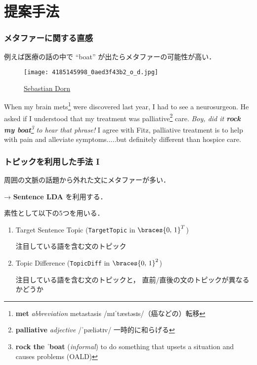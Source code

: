 \documentclass[11pt,usepdftitle=false]{beamer}
\let\phonetic\relax
\newcommand\metaphorical[1]{\textcolor{sRed}{\textbf{#1}}}
\newcommand\abbr[1]{\textcolor{sForestGreen}{#1}}
\newcommand\headword[1]{\textcolor{sDarkBlue}{\textbf{#1}}}
\newcommand\misc[1]{\textcolor{sLightGray2}{(\textit{#1})}}
\let\oldcitep=\citep
\renewcommand\citep[1]{\hyperlink{#1}{\oldcitep{#1}}}
\begin{document}
\section{提案手法}
\begin{frame}
\frametitle{メタファーに関する直感}
例えば医療の話の中で “boat” が出たらメタファーの可能性が高い．
\begin{leftbar}
    \begin{wrapfigure}[7]{r}{0.3\linewidth}
    \centering
    \texttt{[image: 4185145998\_0aed3f43b2\_o\_d.jpg]}
    \captionsetup{font=scriptsize}
    \caption*{\href{https://www.flickr.com/photos/sebadorn/4185145998/in/photolist-7nPY6C-8jDzHw-pn8eY3-HR3vBv-o1HZQF-oph6dL-bCc6C4-9v3Bep-f7D7Vh-4VP8Cr-pgiMKA-6UFukX-dChf6J-oXFcG9-nSLS9D-6mn7RN-3aX8tL-7CEmyn-7KeW2i-h21Dgq-nrT8ZS-nhpe7T-rKYLm-6VskiC-rGyU3e-8gPNfW-8EmjdH-neBGnK-g7svjC-5b5hLj-gj5MDe-aEW8TE-fjHVzv-ccemKm-7B6sf2-4A74GB-norgrd-6QWgS3-rwZs8y-eTbNEs-9AJnaX-5ZHyDc-7iH9bq-7Sx6JX-519bvM-4xZSgU-4sVnuU-6w2yUX-8KTXzr-nkPCbj}{\raisebox{-0.8pt}{\copyright} Sebastian Dorn}}
\end{wrapfigure}
When my brain mets\footnote{\headword{met} \textit{abbreviation} \abbr{metastasis} {\phonetic /mɪˈtæstəsɪs/}（癌などの）転移} were discovered last year, I had to see a neurosurgeon.
    He asked if I understood that my treatment was palliative\footnote{\headword{palliative} \textit{adjective} {\phonetic /ˈpæliətɪv/} 一時的に和らげる} care.
    \textit{Boy, did it \metaphorical{rock my boat}\footnote{\normalfont \headword{rock the ˈboat} \misc{informal} to do something that upsets a situation and causes problems (OALD)} to hear that phrase!}
    I agree with Fitz, palliative treatment is to help with pain and alleviate symptoms.....but definitely different than hospice care.
\end{leftbar}
\end{frame}

\begin{frame}
\frametitle{トピックを利用した手法 I}
周囲の文脈の話題から外れた文にメタファーが多い．

→ \textbf{Sentence LDA} \citep{jo2011}を利用する．

\bigskip

素性として以下の5つを用いる．
\begin{enumerate}
    \item Target Sentence Topic (\texttt{TargetTopic} in $\braces{0,\,1}^T$)

        注目している語を含む文のトピック

    \item Topic Difference (\texttt{TopicDiff} in  $\braces{0,\,1}^2$)

        注目している語を含む文のトピックと，
        直前/直後の文のトピックが異なるかどうか

\end{enumerate}
\end{frame}
\end{document}
